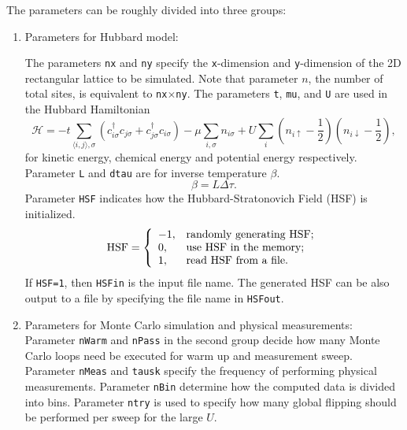 \documentclass[12pt]{article}
\begin{document}
        The parameters can be roughly divided into three groups:
        \begin{enumerate}
            \item Parameters for Hubbard model:

            The parameters \texttt{nx} and \texttt{ny}
            specify the \texttt{x}-dimension and \texttt{y}-dimension of the 2D rectangular lattice to
            be simulated. Note that parameter $n$, the number of total sites,
            is equivalent to \verb|nx|$\times$\verb|ny|.
            The parameters \verb|t|, \verb|mu|, and \verb|U| are used in the Hubbard Hamiltonian
            $$\mathcal{H}=-t \sum_{\langle i,j\rangle, \sigma} \left(c^{\dag}_{i\sigma}c_{j\sigma}+c^{\dag}_{j\sigma}c_{i\sigma}\right)
                        -\mu \sum_{i, \sigma}n_{i\sigma}
                        +U \sum_{i} \left(n_{i\uparrow}-\frac{1}{2}\right) \left(n_{i\downarrow}-\frac{1}{2}\right),$$
            for kinetic energy, chemical energy and potential energy respectively.
            Parameter \verb|L| and \verb|dtau| are for inverse temperature $\beta$.
            $$\beta = L \Delta\tau.$$
            Parameter \verb"HSF" indicates how the Hubbard-Stratonovich Field (HSF) is initialized.
            $$
            \mbox{HSF} = \left\{
                                \begin{array}{ll}
                                    -1, & \hbox{randomly generating HSF;} \\
                                    0, & \hbox{use HSF in the memory;} \\
                                    1, & \hbox{read HSF from a file.}
                                \end{array}
                                \right.
            $$
            If \verb"HSF=1", then \verb"HSFin" is the input file name. The generated HSF can be also output to a file by specifying the file name in \verb"HSFout".

            \item Parameters for Monte Carlo simulation and physical measurements:
            Parameter \verb|nWarm| and \verb|nPass| in the second group decide how many Monte Carlo loops
            need be executed for warm up and measurement sweep. Parameter \verb|nMeas| and \verb|tausk| specify the frequency
            of performing physical measurements. Parameter \verb|nBin|
            determine how the computed data is divided into bins. Parameter \verb"ntry" is used to specify how many global flipping should be performed per sweep for the large $U$.


\end{enumerate}
\end{document}
